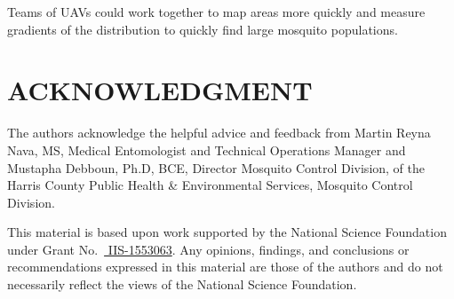 \documentclass[letterpaper, 10 pt, conference]{ieeeconf}  %
\begin{document}
Teams of UAVs could work together to map areas more quickly and measure gradients of the distribution to quickly find large mosquito populations.



\section*{ACKNOWLEDGMENT}
The authors acknowledge the helpful advice and feedback from Martin Reyna Nava, MS, Medical Entomologist and Technical Operations Manager and Mustapha Debboun, Ph.D, BCE, Director Mosquito Control Division, of the Harris County Public Health \& Environmental Services, Mosquito Control Division.

This material is based upon work supported by the National Science Foundation under Grant No.\ 
\href{http://nsf.gov/awardsearch/showAward?AWD_ID=1553063}{ IIS-1553063}.
Any opinions, findings, and conclusions or recommendations expressed in this material are those of the authors and do not necessarily reflect the views of the National Science Foundation.





%

%
%
%
%
%
%
\end{document}
